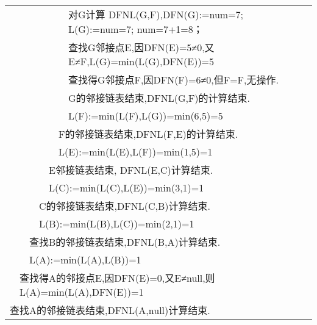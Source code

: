 \begin{solution}
{\begin{tabular}{lllllll}
 &  &  &  &  &  & 对G计算 DFNL(G,F),DFN(G):=num=7;   L(G):=num=7;  num=7+1=8； \\
 &  &  &  &  &  & 查找G邻接点E,因DFN(E)=5≠0,又E≠F,L(G)=min(L(G),DFN(E))=5 \\
 &  &  &  &  &  & 查找得G邻接点F,因DFN(F)=6≠0,但F=F,无操作. \\
 &  &  &  &  &  &  G的邻接链表结束,DFNL(G,F)的计算结束. \\
 &  &  &  &  &  & L(F):=min(L(F),L(G))=min(6,5)=5 \\
 &  &  &  &  & \multicolumn{2}{l}{F的邻接链表结束,DFNL(F,E)的计算结束.} \\
 &  &  &  &  & \multicolumn{2}{l}{L(E):=min(L(E),L(F))=min(1,5)=1} \\
 &  &  &  & \multicolumn{3}{l}{E邻接链表结束, DFNL(E,C)计算结束.} \\
 &  &  &  & \multicolumn{3}{l}{L(C):=min(L(C),L(E))=min(3,1)=1} \\
 &  &  & \multicolumn{4}{l}{C的邻接链表结束,DFNL(C,B)计算结束.} \\
 &  &  & \multicolumn{4}{l}{L(B):=min(L(B),L(C))=min(2,1)=1} \\
 &  & \multicolumn{5}{l}{查找B的邻接链表结束,DFNL(B,A)计算结束.} \\
 &  & \multicolumn{5}{l}{L(A):=min(L(A),L(B))=1} \\
 & \multicolumn{6}{l}{查找得A的邻接点E,因DFN(E)=0,又E≠null,则L(A)=min(L(A),DFN(E))=1} \\
\multicolumn{7}{l}{查找A的邻接链表结束,DFNL(A,null)计算结束.} \\
\end{tabular}
}

\end{solution}
